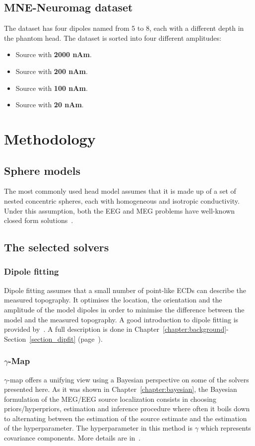 \subsection{MNE-Neuromag dataset} \label{data:used_data}

The dataset has four dipoles named from 5 to 8, each with a different depth in the phantom head. The dataset is sorted into four different amplitudes:
\begin{itemize}
\item Source with \textbf{2000 nAm}.
\item Source with \textbf{200 nAm}.
\item Source with \textbf{100 nAm}.
\item Source with \textbf{20 nAm}.
\end{itemize}

\section{Methodology}

\subsection{Sphere models}
The most commonly used head model assumes that it is made up of a set of nested concentric spheres, each with homogeneous and isotropic conductivity. Under this assumption, both the EEG and MEG problems have well-known closed form solutions~\cite{mosher1999eeg}.

\subsection{The selected solvers}
\subsubsection{Dipole fitting}
Dipole fitting assumes that a small number of point-like \ac{ECD}s can describe the measured topography. It optimises the location, the orientation and the amplitude of the model dipoles in order to minimise the difference between the model and the measured topography. A good introduction to dipole fitting is provided by~\cite{scherg1990fundamentals}. A full description is done in Chapter~\ref{chapter:background}-Section~\ref{section_dipfit} (page~\pageref{section_dipfit}).

\subsubsection{$\gamma$-Map}
$\gamma$-map offers a unifying view using a Bayesian perspective on some of the solvers presented here. As it was shown in Chapter~\ref{chapter:bayesian}, the Bayesian formulation of the MEG/EEG source localization consists in choosing priors/hyperpriors, estimation and inference procedure where often it boils down to alternating between the estimation of the source estimate and the estimation of the hyperparameter. The hyperparameter in this method is $\gamma$ which represents covariance components. More details are in~\cite{Wipf-Nagarajan:2009}.

